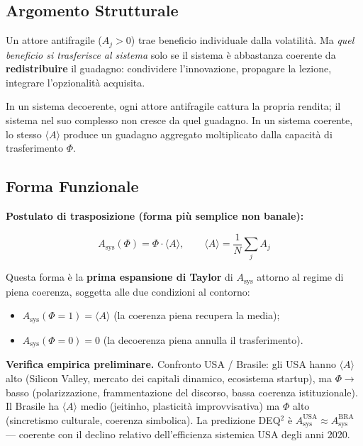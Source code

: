 \subsection{Argomento Strutturale}\label{argomento-strutturale}

Un attore antifragile (\(A_j > 0\)) trae beneficio individuale dalla
volatilità. Ma \emph{quel beneficio si trasferisce al sistema} solo se
il sistema è abbastanza coerente da \textbf{redistribuire} il guadagno:
condividere l'innovazione, propagare la lezione, integrare l'opzionalità
acquisita.

In un sistema decoerente, ogni attore antifragile cattura la propria
rendita; il sistema nel suo complesso non cresce da quel guadagno. In un
sistema coerente, lo stesso \(\langle A \rangle\) produce un guadagno
aggregato moltiplicato dalla capacità di trasferimento \(\Phi\).

\subsection{Forma Funzionale}\label{forma-funzionale}

\Hypoth{} \textbf{Postulato di trasposizione (forma più semplice non
banale):}

\[
A_{\text{sys}}(\Phi) = \Phi \cdot \langle A \rangle, \qquad \langle A \rangle = \frac{1}{N}\sum_j A_j
\]

Questa forma è la \textbf{prima espansione di Taylor} di
\(A_{\text{sys}}\) attorno al regime di piena coerenza, soggetta alle
due condizioni al contorno:

\begin{itemize}
\tightlist
\item
  \(A_{\text{sys}}(\Phi = 1) = \langle A \rangle\) (la coerenza piena
  recupera la media);
\item
  \(A_{\text{sys}}(\Phi = 0) = 0\) (la decoerenza piena annulla il
  trasferimento).
\end{itemize}

\Proved{} \textbf{Verifica empirica preliminare.} Confronto USA /
Brasile: gli USA hanno \(\langle A \rangle\) alto (Silicon Valley,
mercato dei capitali dinamico, ecosistema startup), ma \(\Phi \to\)
basso (polarizzazione, frammentazione del discorso, bassa coerenza
istituzionale). Il Brasile ha \(\langle A \rangle\) medio (jeitinho,
plasticità improvvisativa) ma \(\Phi\) alto (sincretismo culturale,
coerenza simbolica). La predizione DEQ$^2$ è
\(A_{\text{sys}}^{\text{USA}} \approx A_{\text{sys}}^{\text{BRA}}\) ---
coerente con il declino relativo dell'efficienza sistemica USA degli
anni 2020.

